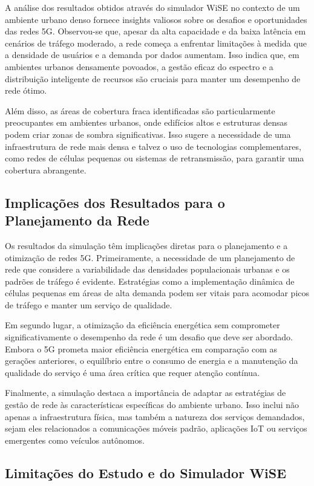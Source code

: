 \documentclass[journal]{IEEEtran}
\begin{document}
A análise dos resultados obtidos através do simulador WiSE no contexto de um ambiente urbano denso fornece insights valiosos sobre os desafios e oportunidades das redes 5G. Observou-se que, apesar da alta capacidade e da baixa latência em cenários de tráfego moderado, a rede começa a enfrentar limitações à medida que a densidade de usuários e a demanda por dados aumentam. Isso indica que, em ambientes urbanos densamente povoados, a gestão eficaz do espectro e a distribuição inteligente de recursos são cruciais para manter um desempenho de rede ótimo.

Além disso, as áreas de cobertura fraca identificadas são particularmente preocupantes em ambientes urbanos, onde edifícios altos e estruturas densas podem criar zonas de sombra significativas. Isso sugere a necessidade de uma infraestrutura de rede mais densa e talvez o uso de tecnologias complementares, como redes de células pequenas ou sistemas de retransmissão, para garantir uma cobertura abrangente.

\subsection{Implicações dos Resultados para o Planejamento da Rede}

Os resultados da simulação têm implicações diretas para o planejamento e a otimização de redes 5G. Primeiramente, a necessidade de um planejamento de rede que considere a variabilidade das densidades populacionais urbanas e os padrões de tráfego é evidente. Estratégias como a implementação dinâmica de células pequenas em áreas de alta demanda podem ser vitais para acomodar picos de tráfego e manter um serviço de qualidade.

Em segundo lugar, a otimização da eficiência energética sem comprometer significativamente o desempenho da rede é um desafio que deve ser abordado. Embora o 5G prometa maior eficiência energética em comparação com as gerações anteriores, o equilíbrio entre o consumo de energia e a manutenção da qualidade do serviço é uma área crítica que requer atenção contínua.

Finalmente, a simulação destaca a importância de adaptar as estratégias de gestão de rede às características específicas do ambiente urbano. Isso inclui não apenas a infraestrutura física, mas também a natureza dos serviços demandados, sejam eles relacionados a comunicações móveis padrão, aplicações IoT ou serviços emergentes como veículos autônomos.

\subsection{Limitações do Estudo e do Simulador WiSE}
\end{document}

